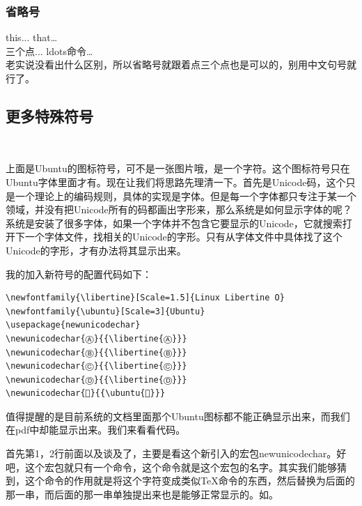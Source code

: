 \documentclass[12pt,oneside]{book}
\begin{document}
\begin{common-format}
\subsubsection{省略号}
this...   that\ldots   \\
三个点...   ldots命令\ldots  \\
老实说没看出什么区别，所以省略号就跟着点三个点也是可以的，别用中文句号就行了。



\subsection{更多特殊符号}
{\fontsize{40pt}{20pt}\selectfont \color[HTML]{DE4815}  }

上面是Ubuntu的图标符号，可不是一张图片哦，是一个字符。这个图标符号只在Ubuntu字体里面才有。现在让我们将思路先理清一下。首先是Unicode码，这个只是一个理论上的编码规则，具体的实现是字体。但是每一个字体都只专注于某一个领域，并没有把Unicode所有的码都画出字形来，那么系统是如何显示字体的呢？系统是安装了很多字体，如果一个字体并不包含它要显示的Unicode，它就搜索打开下一个字体文件，找相关的Unicode的字形。只有从字体文件中具体找了这个Unicode的字形，才有办法将其显示出来。

我的加入新符号的配置代码如下：
\begin{Verbatim}
\newfontfamily{\libertine}[Scale=1.5]{Linux Libertine O}
\newfontfamily{\ubuntu}[Scale=3]{Ubuntu}
\usepackage{newunicodechar}
\newunicodechar{Ⓐ}{{\libertine{Ⓐ}}}
\newunicodechar{Ⓑ}{{\libertine{Ⓑ}}}
\newunicodechar{Ⓒ}{{\libertine{Ⓒ}}} 
\newunicodechar{Ⓓ}{{\libertine{Ⓓ}}}
\newunicodechar{}{{\ubuntu{}}}
\end{Verbatim}

值得提醒的是目前系统的文档里面那个Ubuntu图标都不能正确显示出来，而我们在pdf中却能显示出来。我们来看看代码。

首先第1，2行前面以及谈及了，主要是看这个新引入的宏包newunicodechar。好吧，这个宏包就只有一个命令，这个命令就是这个宏包的名字。其实我们能够猜到，这个命令的作用就是将这个字符变成类似\TeX 命令的东西，然后替换为后面的那一串，而后面的那一串单独提出来也是能够正常显示的。如{}。


\end{common-format}
\end{document}

